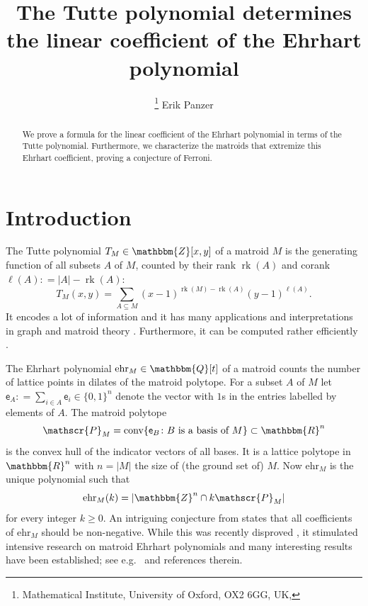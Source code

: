 \documentclass[pagesize,paper=A4,11pt,bibliography=totoc,oneside]{scrartcl}
\title{\vspace{-10mm}The Tutte polynomial determines the linear coefficient of the Ehrhart polynomial}
\author{%
    \thanks{Mathematical Institute, University of Oxford, OX2 6GG, UK, \email{erik.panzer@maths.ox.ac.uk}}
    Erik Panzer
    \orcidlink{0000-0002-9897-5812}
}
\newcommand{\ZZ}{\mathbbm{Z}}
\newcommand{\QQ}{\mathbbm{Q}}
\newcommand{\RR}{\mathbbm{R}}
\newcommand{\defas}{\mathrel{\mathop:}=}
\newcommand{\abs}[1]{\left|#1\right|}
\DeclareMathOperator{\rk}{rk}
\newcommand{\MP}[1]{\mathscr{P}_{#1}} %
\DeclareMathOperator{\conv}{conv}
\newcommand{\uv}{\mathsf{e}} %
\newcommand{\ehr}{\mathrm{ehr}}
\newcommand{\Tutte}{T}
\begin{document}
\maketitle

\begin{abstract}\vspace{-1cm}
    We prove a formula for the linear coefficient of the Ehrhart polynomial in terms of the Tutte polynomial. Furthermore, we characterize the matroids that extremize this Ehrhart coefficient, proving a conjecture of Ferroni.
\end{abstract}

\section{Introduction}
The Tutte polynomial $\Tutte_M\in\ZZ[x,y]$ of a matroid $M$ is the generating function of all subsets $A$ of $M$, counted by their rank $\rk(A)$ and corank $\ell(A)\defas\abs{A}-\rk(A)$:
\begin{equation*}
    \Tutte_M(x,y)=\sum_{A\subseteq M} (x-1)^{\rk(M)-\rk(A)}(y-1)^{\ell(A)}.
\end{equation*}
It encodes a lot of information and it has many applications and interpretations in graph and matroid theory \cite{BrylawskiOxley:TutteApp,Crapo:Tutte,EllisMonaghanMerino:ApplicationsI}. Furthermore, it can be computed rather efficiently \cite{BHKK:TutteVertex,HaagardPearceRoyle:CompTutte}.

The Ehrhart polynomial $\ehr_M\in \QQ[t]$ of a matroid counts the number of lattice points in dilates of the matroid polytope. For a subset $A$ of $M$ let $\uv_{A}\defas\sum_{i\in A}\uv_i\in\{0,1\}^n$ denote the vector with $1$s in the entries labelled by elements of $A$. The matroid polytope
\begin{equation*}
	\MP{M}=\conv\{\uv_B\colon \text{$B$ is a basis of $M$}\}\subset\RR^n
\end{equation*}
is the convex hull of the indicator vectors of all bases. It is a lattice polytope in $\RR^n$ with $n=\abs{M}$ the size of (the ground set of) $M$. Now $\ehr_M$ is the unique polynomial such that
\begin{equation*}
	\ehr_M(k)=\abs{\ZZ^n \cap k\MP{M}}
\end{equation*}
for every integer $k\geq 0$. An intriguing conjecture from \cite{DeLoeraHawsKoeppe:Ehrhart} states that all coefficients of $\ehr_M$ should be non-negative. While this was recently disproved \cite{Ferroni:MatNotEhr}, it stimulated intensive research on matroid Ehrhart polynomials and many interesting results have been established; see e.g.\ \cite{FerroniMoralesPanova:EhrPosLat,Ferroni:HyperPositive,FanLi:EhrhartSchubert} and references therein.
\end{document}
